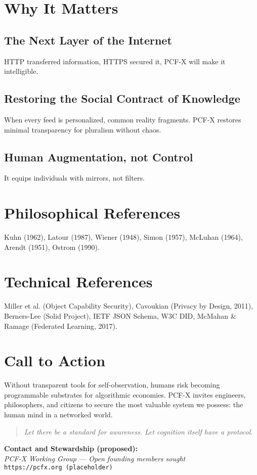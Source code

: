 \documentclass[12pt]{article}
\begin{document}
\section{Why It Matters}
\subsection{The Next Layer of the Internet}
HTTP transferred information, HTTPS secured it, PCF-X will make it intelligible.  

\subsection{Restoring the Social Contract of Knowledge}
When every feed is personalized, common reality fragments.  
PCF-X restores minimal transparency for pluralism without chaos.  

\subsection{Human Augmentation, not Control}
It equips individuals with mirrors, not filters.

\section{Philosophical References}
Kuhn (1962), Latour (1987), Wiener (1948), Simon (1957), McLuhan (1964), Arendt (1951), Ostrom (1990).

\section{Technical References}
Miller et al. (Object Capability Security), Cavoukian (Privacy by Design, 2011), Berners-Lee (Solid Project),  
IETF JSON Schema, W3C DID, McMahan \& Ramage (Federated Learning, 2017).

\section{Call to Action}
Without transparent tools for self-observation, humans risk becoming programmable substrates for algorithmic economies.  
PCF-X invites engineers, philosophers, and citizens to secure the most valuable system we possess: the human mind in a networked world.

\begin{quote}
\textit{Let there be a standard for awareness.  
Let cognition itself have a protocol.}
\end{quote}

\bigskip
\noindent\textbf{Contact and Stewardship (proposed):}\\
\textit{PCF-X Working Group — Open founding members sought}\\
\texttt{https://pcfx.org (placeholder)}
\end{document}
